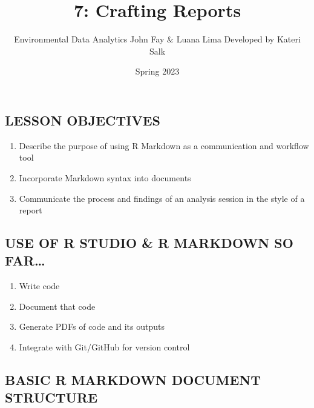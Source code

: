 \documentclass[
]{article}
\title{7: Crafting Reports}
\author{Environmental Data Analytics \textbar{} John Fay \& Luana Lima
\textbar{} Developed by Kateri Salk}
\date{Spring 2023}
\providecommand{\tightlist}{%
  \setlength{\itemsep}{0pt}\setlength{\parskip}{0pt}}
\begin{document}
\maketitle

{
\setcounter{tocdepth}{2}
\tableofcontents
}
\hypertarget{lesson-objectives}{%
\subsection{LESSON OBJECTIVES}\label{lesson-objectives}}

\begin{enumerate}
\def\labelenumi{\arabic{enumi}.}
\tightlist
\item
  Describe the purpose of using R Markdown as a communication and
  workflow tool
\item
  Incorporate Markdown syntax into documents
\item
  Communicate the process and findings of an analysis session in the
  style of a report
\end{enumerate}

\hypertarget{use-of-r-studio-r-markdown-so-far}{%
\subsection{USE OF R STUDIO \& R MARKDOWN SO
FAR\ldots{}}\label{use-of-r-studio-r-markdown-so-far}}

\begin{enumerate}
\def\labelenumi{\arabic{enumi}.}
\tightlist
\item
  Write code
\item
  Document that code
\item
  Generate PDFs of code and its outputs
\item
  Integrate with Git/GitHub for version control
\end{enumerate}

\hypertarget{basic-r-markdown-document-structure}{%
\subsection{BASIC R MARKDOWN DOCUMENT
STRUCTURE}\label{basic-r-markdown-document-structure}}
\end{document}
